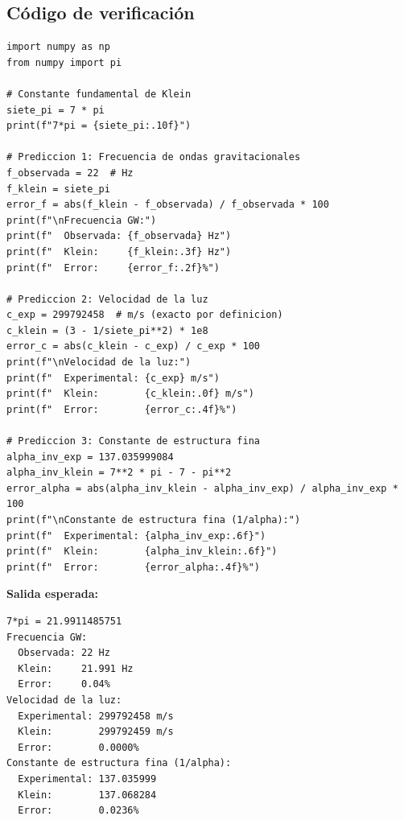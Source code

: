 \documentclass[12pt,a4paper,openany]{book}
\begin{document}
\begin{nivelcodigo}

\section*{Código de verificación}

\begin{lstlisting}[caption={Verificación del Capítulo 1}]
import numpy as np
from numpy import pi

# Constante fundamental de Klein
siete_pi = 7 * pi
print(f"7*pi = {siete_pi:.10f}")

# Prediccion 1: Frecuencia de ondas gravitacionales
f_observada = 22  # Hz
f_klein = siete_pi
error_f = abs(f_klein - f_observada) / f_observada * 100
print(f"\nFrecuencia GW:")
print(f"  Observada: {f_observada} Hz")
print(f"  Klein:     {f_klein:.3f} Hz")
print(f"  Error:     {error_f:.2f}%")

# Prediccion 2: Velocidad de la luz
c_exp = 299792458  # m/s (exacto por definicion)
c_klein = (3 - 1/siete_pi**2) * 1e8
error_c = abs(c_klein - c_exp) / c_exp * 100
print(f"\nVelocidad de la luz:")
print(f"  Experimental: {c_exp} m/s")
print(f"  Klein:        {c_klein:.0f} m/s")
print(f"  Error:        {error_c:.4f}%")

# Prediccion 3: Constante de estructura fina
alpha_inv_exp = 137.035999084
alpha_inv_klein = 7**2 * pi - 7 - pi**2
error_alpha = abs(alpha_inv_klein - alpha_inv_exp) / alpha_inv_exp * 100
print(f"\nConstante de estructura fina (1/alpha):")
print(f"  Experimental: {alpha_inv_exp:.6f}")
print(f"  Klein:        {alpha_inv_klein:.6f}")
print(f"  Error:        {error_alpha:.4f}%")
\end{lstlisting}

\textbf{Salida esperada:}
\begin{verbatim}
7*pi = 21.9911485751
Frecuencia GW:
  Observada: 22 Hz
  Klein:     21.991 Hz
  Error:     0.04%
Velocidad de la luz:
  Experimental: 299792458 m/s
  Klein:        299792459 m/s
  Error:        0.0000%
Constante de estructura fina (1/alpha):
  Experimental: 137.035999
  Klein:        137.068284
  Error:        0.0236%
\end{verbatim}

\end{nivelcodigo}

\end{document}

